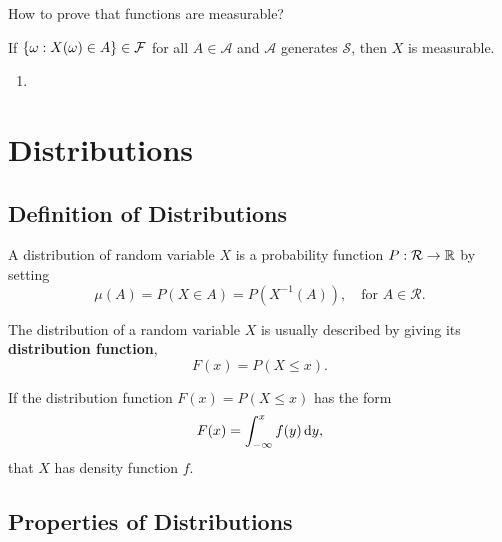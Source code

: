 How to prove that functions are measurable?

\begin{theorem}
	If \(\{\omega:X(\omega)\in A\}\in\mathcal{F}\) for all \(A\in\mathcal{A}\) and \(\mathcal{A}\) generates \(\mathcal{S}\), then \(X\) is measurable.
\end{theorem}

\begin{enumerate}
	\item
\end{enumerate}

\section{Distributions}

\subsection{Definition of Distributions}

\begin{definition}[Distribution]
	A distribution of random variable \(X\) is a probability function \(P:\mathcal{R}\rightarrow\mathbb{R}\) by setting
	\begin{equation}
		\mu(A)=P(X\in A)=P\left(X^{-1}(A)\right),\quad\text{for }A\in\mathcal{R}.
	\end{equation}
\end{definition}

\begin{definition}
	The distribution of a random variable \(X\) is usually described by giving its \textbf{distribution function},
	\begin{equation}
		F(x)=P(X\leq x).
	\end{equation}
\end{definition}

\begin{definition}
	If the distribution function \(F(x)=P(X\leq x)\) has the form
	\begin{equation*}
		F(x)=\int_{-\infty}^{x}f(y)\mathop{}\!\mathrm{d} y,
	\end{equation*}
	that \(X\) has density function \(f\).
\end{definition}

\subsection{Properties of Distributions}

